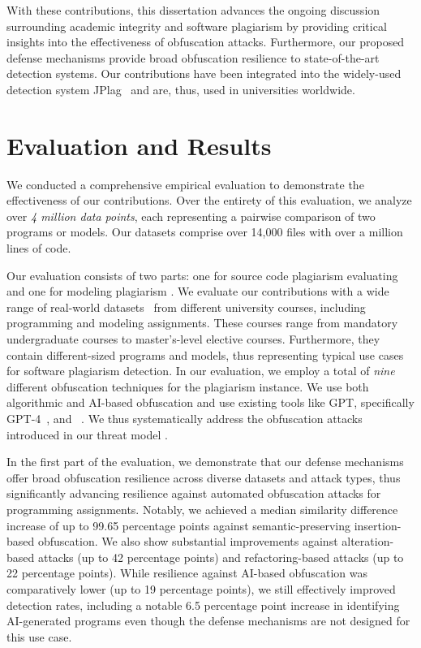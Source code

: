 With these contributions, this dissertation advances the ongoing discussion surrounding academic integrity and software plagiarism by providing critical insights into the effectiveness of obfuscation attacks.
Furthermore, our proposed defense mechanisms provide broad obfuscation resilience to state-of-the-art detection systems.
Our contributions have been integrated into the widely-used detection system JPlag~\cite{prechelt2000, prechelt2002} and are, thus, used in universities worldwide.

\section{Evaluation and Results}
We conducted a comprehensive empirical evaluation to demonstrate the effectiveness of our contributions.
Over the entirety of this evaluation, we analyze over \textit{4 million data points}, each representing a pairwise comparison of two programs or models. Our datasets comprise over 14,000 files with over a million lines of code.

Our evaluation consists of two parts: one for source code plagiarism evaluating  and one for modeling plagiarism .
We evaluate our contributions with a wide range of real-world datasets~\cite{paiva2023, Ljubovic2020a, Saglam2024b} from different university courses, including programming and modeling assignments. These courses range from mandatory undergraduate courses to master's-level elective courses. Furthermore, they contain different-sized programs and models, thus representing typical use cases for software plagiarism detection.
In our evaluation, we employ a total of \textit{nine} different obfuscation techniques for the plagiarism instance.
We use both algorithmic and AI-based obfuscation and use existing tools like \ac{GPT}, specifically GPT-4~\cite{gpt4}, and \mossad~\cite{DevoreMcDonald2020}.
We thus systematically address the obfuscation attacks introduced in our threat model .

In the first part of the evaluation, we demonstrate that our defense mechanisms offer broad obfuscation resilience across diverse datasets and attack types, thus significantly advancing resilience against automated obfuscation attacks for programming assignments.
%
Notably, we achieved a median similarity difference increase of up to 99.65 percentage points against semantic-preserving insertion-based obfuscation. We also show substantial improvements against alteration-based attacks (up to 42 percentage points) and refactoring-based attacks (up to 22 percentage points). While resilience against AI-based obfuscation was comparatively lower (up to 19 percentage points), we still effectively improved detection rates, including a notable 6.5 percentage point increase in identifying AI-generated programs even though the defense mechanisms are not designed for this use case.

